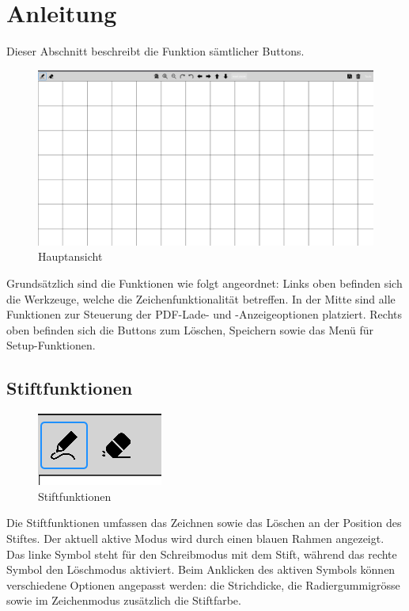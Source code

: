 \section{Anleitung}
Dieser Abschnitt beschreibt die Funktion sämtlicher Buttons.

\begin{figure}[H]
    \centering
    \includegraphics[width=0.5\linewidth]{graphics/ui_screenshot.png}
    \caption{Hauptansicht}
    \label{fig:ui_screenshot}
\end{figure}

Grundsätzlich sind die Funktionen wie folgt angeordnet:  
Links oben befinden sich die Werkzeuge, welche die Zeichenfunktionalität betreffen. In der Mitte sind alle Funktionen zur Steuerung der PDF-Lade- und -Anzeigeoptionen platziert. Rechts oben befinden sich die Buttons zum Löschen, Speichern sowie das Menü für Setup-Funktionen.

\subsection{Stiftfunktionen}
\begin{figure}[H]
    \centering
    \includegraphics[width=0.5\linewidth]{graphics/stift_funktionen.png}
    \caption{Stiftfunktionen}
    \label{fig:stift_funktionen}
\end{figure}

Die Stiftfunktionen umfassen das Zeichnen sowie das Löschen an der Position des Stiftes. Der aktuell aktive Modus wird durch einen blauen Rahmen angezeigt.  
Das linke Symbol steht für den Schreibmodus mit dem Stift, während das rechte Symbol den Löschmodus aktiviert.  
Beim Anklicken des aktiven Symbols können verschiedene Optionen angepasst werden: die Strichdicke, die Radiergummigrösse sowie im Zeichenmodus zusätzlich die Stiftfarbe.

